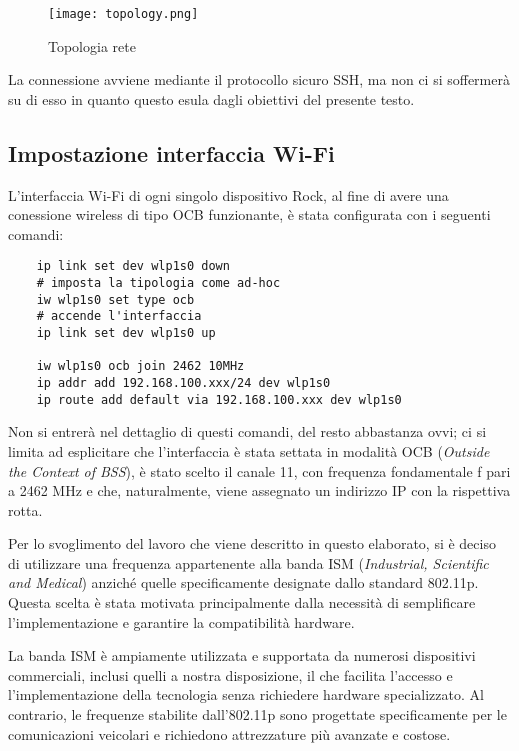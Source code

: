 \begin{figure}[h!]
    \centering
    \texttt{[image: topology.png]}
    \caption{Topologia rete}
    \label{fig:etichetta}
\end{figure}

La connessione avviene mediante il protocollo sicuro SSH, ma non ci si soffermerà su di esso in quanto questo esula dagli obiettivi del presente testo.

\subsection[Impostazione interfaccia Wi-Fi]{Impostazione interfaccia Wi-Fi}
L'interfaccia Wi-Fi di ogni singolo dispositivo Rock, al fine di avere una conessione wireless di tipo OCB funzionante, è stata configurata con i seguenti comandi:

\begin{lstlisting}
    ip link set dev wlp1s0 down
    # imposta la tipologia come ad-hoc
    iw wlp1s0 set type ocb
    # accende l'interfaccia
    ip link set dev wlp1s0 up
    
    iw wlp1s0 ocb join 2462 10MHz
    ip addr add 192.168.100.xxx/24 dev wlp1s0
    ip route add default via 192.168.100.xxx dev wlp1s0
\end{lstlisting}

Non si entrerà nel dettaglio di questi comandi, del resto abbastanza ovvi; ci si limita ad esplicitare che l'interfaccia è stata settata in modalità OCB (\textit{Outside the Context of BSS}), è stato scelto il canale 11, con frequenza fondamentale f pari a 2462 MHz e che, naturalmente, viene assegnato un indirizzo IP con la rispettiva rotta.

Per lo svoglimento del lavoro che viene descritto in questo elaborato, si è deciso di utilizzare una frequenza appartenente alla banda ISM (\textit{Industrial, Scientific and Medical}) anziché quelle specificamente designate dallo standard 802.11p. Questa scelta è stata motivata principalmente dalla necessità di semplificare l'implementazione e garantire la compatibilità hardware.

La banda ISM è ampiamente utilizzata e supportata da numerosi dispositivi commerciali, inclusi quelli a nostra disposizione, il che facilita l'accesso e l'implementazione della tecnologia senza richiedere hardware specializzato. Al contrario, le frequenze stabilite dall'802.11p sono progettate specificamente per le comunicazioni veicolari e richiedono attrezzature più avanzate e costose.

